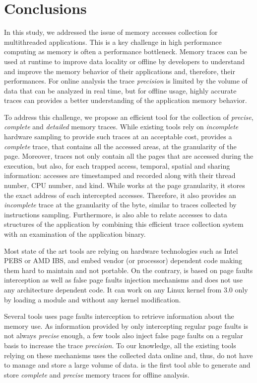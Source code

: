 \section{Conclusions}
\label{sec:cncl}

In this study, we addressed the issue of memory accesses collection for
multithreaded applications. This is a key challenge in high performance
computing as memory is often a performance
bottleneck. Memory traces can be used at runtime to improve data locality or
offline by developers to understand and improve the memory
behavior of their applications and, therefore, their performances. For online analysis the trace \emph{precision}
is limited by the volume of data that can be analyzed in real time, but for
offline usage, highly accurate traces can provides a better understanding of
the application memory behavior.

To address this challenge, we propose \Moca an efficient tool for the collection of \emph{precise},
\emph{complete} and \emph{detailed} memory traces. While existing tools
rely on \emph{incomplete} hardware sampling to
provide such traces at an acceptable cost, \Moca provides a \emph{complete}
trace, that contains all the accessed areas, at the granularity of the page.
Moreover, \Moca traces not only
contain all the pages that are accessed during the execution, but also, 
for each trapped access, temporal, spatial and sharing
information: accesses are timestamped and recorded along with their thread number, CPU number, and kind.
While \Moca works at the page granularity, it stores the exact
address of each intercepted accesses. Therefore, it also provides an
\emph{incomplete} trace at the granularity of the byte, similar to
traces collected by instructions sampling. Furthermore, \Moca is also able to relate accesses to
data structures of the application by combining this efficient trace collection system with an examination
of the application binary.

Most state of the art tools are relying on hardware technologies such as Intel PEBS
or AMD IBS, and embed vendor (or processor) dependent code making them hard
to maintain and not portable. On the contrary, \Moca is based on page
faults interception as well as false page faults injection mechanisms and does not use any architecture dependent code.
It can work on any Linux kernel from $3.0$ only by loading a module and
without any kernel modification.

Several tools uses page faults interception to retrieve information about the memory
use. As information provided by only intercepting regular page faults
is not always \emph{precise} enough, a few tools also inject false page faults
on a regular basis to increase the trace \emph{precision}. To our knowledge, all the
existing tools relying on these mechanisms uses the collected data online and,
thus, do not have to manage and store a large volume of data. \Moca is the
first tool able to generate and store \emph{complete} and \emph{precise} memory traces for offline
analysis.

